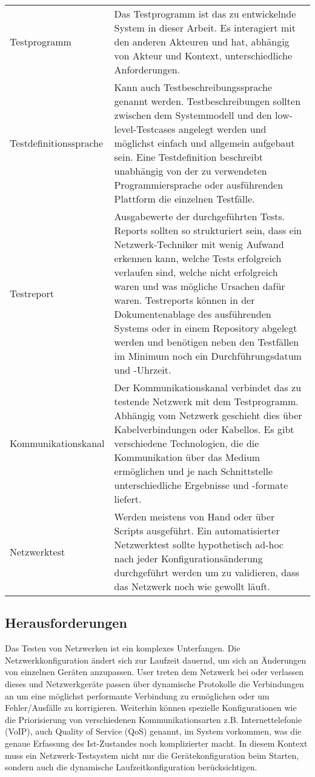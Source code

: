 \documentclass[
	ngerman,
	toc=listof, %
	toc=bibliography, %
	footnotes=multiple, %
	parskip=half, %
	numbers=noendperiod %
]{scrartcl}
\begin{document}
		\begin{tabularx}{\textwidth}{lX}
			\toprule
			Testprogramm &  Das Testprogramm ist das zu entwickelnde System in dieser Arbeit. Es interagiert mit den anderen Akteuren und hat, abhängig von Akteur und Kontext, unterschiedliche Anforderungen. \\
			Testdefinitionssprache & Kann auch Testbeschreibungssprache genannt werden. Testbeschreibungen sollten zwischen dem Systemmodell und den low-level-Testcases angelegt werden und möglichst einfach und allgemein aufgebaut sein. Eine Testdefinition beschreibt unabhängig von der zu verwendeten Programmiersprache oder ausführenden Plattform die einzelnen Testfälle. \\
			Testreport & Ausgabewerte der durchgeführten Tests. Reports sollten so strukturiert sein, dass ein Netzwerk-Techniker mit wenig Aufwand erkennen kann, welche Tests erfolgreich verlaufen sind, welche nicht erfolgreich waren und was mögliche Ursachen dafür waren. Testreports können in der Dokumentenablage des ausführenden Systems oder in einem Repository abgelegt werden und benötigen neben den Testfällen im Minimum noch ein Durchführungsdatum und -Uhrzeit. \\
			\midrule
			Kommunikationskanal & Der Kommunikationskanal verbindet das zu testende Netzwerk mit dem Testprogramm. Abhängig vom Netzwerk geschieht dies über Kabelverbindungen oder Kabellos. Es gibt verschiedene Technologien, die die Kommunikation über das Medium ermöglichen und je nach Schnittstelle unterschiedliche Ergebnisse und -formate liefert. \\
			Netzwerktest & Werden meistens von Hand oder über Scripts ausgeführt. Ein automatisierter Netzwerktest sollte hypothetisch ad-hoc nach jeder Konfigurationsänderung durchgeführt werden um zu validieren, dass das Netzwerk noch wie gewollt läuft. \\
			\bottomrule
		\end{tabularx}
		\newpage

	\subsection{Herausforderungen}
	Das Testen von Netzwerken ist ein komplexes Unterfangen. 
	Die Netzwerkkonfiguration ändert sich zur Laufzeit dauernd, um sich an Änderungen von einzelnen Geräten anzupassen.
	User treten dem Netzwerk bei oder verlassen dieses und Netzwerkgeräte passen über dynamische Protokolle die Verbindungen an um eine möglichst performante Verbindung zu ermöglichen oder um Fehler/Ausfälle zu korrigieren.
	Weiterhin können spezielle Konfigurationen wie die Priorisierung von verschiedenen Kommunikationsarten z.B. Internettelefonie (VoIP), auch Quality of Service (QoS) genannt, im System vorkommen, was die genaue Erfassung des Ist-Zustandes noch komplizierter macht.
	In diesem Kontext muss ein Netzwerk-Testsystem nicht nur die Gerätekonfiguration beim Starten, sondern auch die dynamische Laufzeitkonfiguration berücksichtigen.
	
\end{document}
